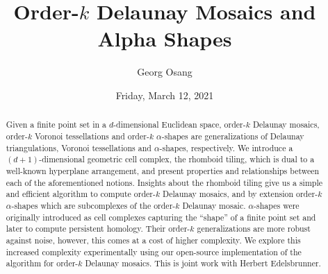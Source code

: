 \documentclass{UAmathtalk}
\author{Georg Osang}
\title{Order-$k$ Delaunay Mosaics and Alpha Shapes}
\date{Friday, March 12, 2021}
\begin{document}
\maketitle

%

\begin{abstract}
Given a finite point set in a $d$-dimensional Euclidean space, order-$k$ Delaunay mosaics, order-$k$ Voronoi tessellations and order-$k$ $\alpha$-shapes are generalizations of Delaunay triangulations, Voronoi tessellations and $\alpha$-shapes, respectively.
We introduce a $(d+1)$-dimensional geometric cell complex, the rhomboid tiling, which is dual to a well-known hyperplane arrangement, and present properties and relationships between each of the aforementioned notions.
Insights about the rhomboid tiling give us a simple and efficient algorithm to compute order-$k$ Delaunay mosaics, and by extension order-$k$ $\alpha$-shapes which are subcomplexes of the order-$k$ Delaunay mosaic.
$\alpha$-shapes were originally introduced as cell complexes capturing the ``shape'' of a finite point set and later to compute persistent homology. Their order-$k$ generalizations are more robust against noise, however, this comes at a cost of higher complexity. We explore this increased complexity experimentally using our open-source implementation of the algorithm for order-$k$ Delaunay mosaics. This is joint work with Herbert Edelsbrunner.
\end{abstract}
\end{document}
